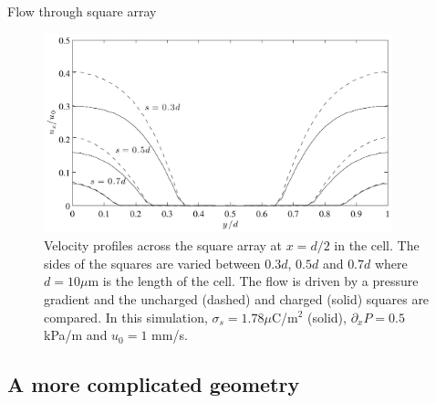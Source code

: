 \begin{frame}{Flow through square array}

\begin{figure}
\begin{center}
\includegraphics[width=0.9\textwidth]{../fig/square_u_mid.pdf}
\end{center}
\caption{Velocity profiles across the square array at $x = d/2$ in the
  cell. The sides of the squares are varied between $0.3d$, $0.5d$ and
  $0.7d$ where $d = 10 \mu$m is the length of the cell. The flow is
  driven by a pressure gradient and the uncharged (dashed) and charged
  (solid) squares are compared. In this simulation, $\sigma_s = 1.78
  \mu$C/m$^2$ (solid), $\partial_xP = 0.5$ kPa/m and $u_0 = 1$ mm/s. }
\label{fig:res:mid}
\end{figure}

\end{frame}

\subsection{A more complicated geometry}

